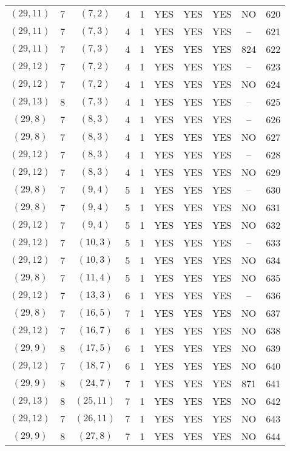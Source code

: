 \begin{longtable}{|c|c|c|c|c|c|c|c|c|c|}
$(29, 11)$ & 7 & $(7, 2)$ & 4 & 1 & YES & YES & YES & NO & 620\\
$(29, 11)$ & 7 & $(7, 3)$ & 4 & 1 & YES & YES & YES & -- & 621\\
$(29, 11)$ & 7 & $(7, 3)$ & 4 & 1 & YES & YES & YES & 824 & 622\\
$(29, 12)$ & 7 & $(7, 2)$ & 4 & 1 & YES & YES & YES & -- & 623\\
$(29, 12)$ & 7 & $(7, 2)$ & 4 & 1 & YES & YES & YES & NO & 624\\
$(29, 13)$ & 8 & $(7, 3)$ & 4 & 1 & YES & YES & YES & -- & 625\\
$(29, 8)$ & 7 & $(8, 3)$ & 4 & 1 & YES & YES & YES & -- & 626\\
$(29, 8)$ & 7 & $(8, 3)$ & 4 & 1 & YES & YES & YES & NO & 627\\
$(29, 12)$ & 7 & $(8, 3)$ & 4 & 1 & YES & YES & YES & -- & 628\\
$(29, 12)$ & 7 & $(8, 3)$ & 4 & 1 & YES & YES & YES & NO & 629\\
$(29, 8)$ & 7 & $(9, 4)$ & 5 & 1 & YES & YES & YES & -- & 630\\
$(29, 8)$ & 7 & $(9, 4)$ & 5 & 1 & YES & YES & YES & NO & 631\\
$(29, 12)$ & 7 & $(9, 4)$ & 5 & 1 & YES & YES & YES & NO & 632\\
$(29, 12)$ & 7 & $(10, 3)$ & 5 & 1 & YES & YES & YES & -- & 633\\
$(29, 12)$ & 7 & $(10, 3)$ & 5 & 1 & YES & YES & YES & NO & 634\\
$(29, 8)$ & 7 & $(11, 4)$ & 5 & 1 & YES & YES & YES & NO & 635\\
$(29, 12)$ & 7 & $(13, 3)$ & 6 & 1 & YES & YES & YES & -- & 636\\
$(29, 8)$ & 7 & $(16, 5)$ & 7 & 1 & YES & YES & YES & NO & 637\\
$(29, 12)$ & 7 & $(16, 7)$ & 6 & 1 & YES & YES & YES & NO & 638\\
$(29, 9)$ & 8 & $(17, 5)$ & 6 & 1 & YES & YES & YES & NO & 639\\
$(29, 12)$ & 7 & $(18, 7)$ & 6 & 1 & YES & YES & YES & NO & 640\\
$(29, 9)$ & 8 & $(24, 7)$ & 7 & 1 & YES & YES & YES & 871 & 641\\
$(29, 13)$ & 8 & $(25, 11)$ & 7 & 1 & YES & YES & YES & NO & 642\\
$(29, 12)$ & 7 & $(26, 11)$ & 7 & 1 & YES & YES & YES & NO & 643\\
$(29, 9)$ & 8 & $(27, 8)$ & 7 & 1 & YES & YES & YES & NO & 644\\

\end{longtable}
